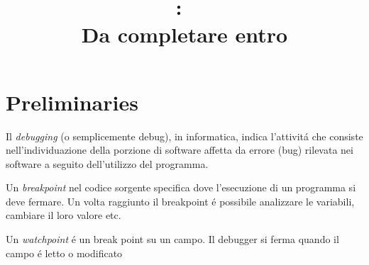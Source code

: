\documentclass{article}
\title{
\vspace{2in}
\textmd{\textbf{\hmwkClass:\ \hmwkTitle}}\\
\normalsize\vspace{0.1in}\small{Da completare entro \hmwkDueDate}\\
\vspace{0.1in}\large{\textit{\hmwkClassInstructor}}
\vspace{3in}
}
\author{\textbf{\hmwkAuthorName}}
\date{} %
\begin{document}
\maketitle



\newpage
\tableofcontents
\newpage



\section{Preliminaries}
Il \emph{debugging} (o semplicemente debug), in informatica, indica l'attivit\' a   che consiste nell'individuazione della porzione di software affetta da errore (bug) rilevata nei software a seguito dell'utilizzo del programma.

Un \emph{breakpoint} nel codice sorgente specifica dove l'esecuzione di un programma si deve fermare. Un volta raggiunto il breakpoint \' e possibile analizzare le variabili, cambiare il loro valore etc.

Un \emph{watchpoint} \' e un break point su un campo. Il debugger si ferma quando il campo \' e letto o modificato
\end{document}

